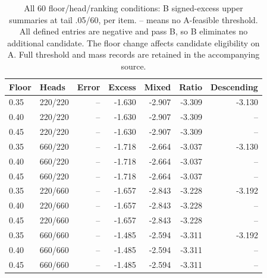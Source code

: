 \begin{table}[t]\centering\scriptsize
\caption{All 60 floor/head/ranking conditions: B signed-excess upper summaries at tail .05/60, per item. -- means no A-feasible threshold. All defined entries are negative and pass B, so B eliminates no additional candidate. The floor change affects candidate eligibility on A. Full threshold and mass records are retained in the accompanying source.}\label{tab:v8-floor-screen}
\begin{tabular}{llrrrrr}\toprule
Floor & Heads & Error & Excess & Mixed & Ratio & Descending\\\midrule
0.35 & 220/220 & -- & -1.630 & -2.907 & -3.309 & -3.130 \\
0.40 & 220/220 & -- & -1.630 & -2.907 & -3.309 & -- \\
0.45 & 220/220 & -- & -1.630 & -2.907 & -3.309 & -- \\
0.35 & 660/220 & -- & -1.718 & -2.664 & -3.037 & -3.130 \\
0.40 & 660/220 & -- & -1.718 & -2.664 & -3.037 & -- \\
0.45 & 660/220 & -- & -1.718 & -2.664 & -3.037 & -- \\
0.35 & 220/660 & -- & -1.657 & -2.843 & -3.228 & -3.192 \\
0.40 & 220/660 & -- & -1.657 & -2.843 & -3.228 & -- \\
0.45 & 220/660 & -- & -1.657 & -2.843 & -3.228 & -- \\
0.35 & 660/660 & -- & -1.485 & -2.594 & -3.311 & -3.192 \\
0.40 & 660/660 & -- & -1.485 & -2.594 & -3.311 & -- \\
0.45 & 660/660 & -- & -1.485 & -2.594 & -3.311 & -- \\
\bottomrule\end{tabular}\end{table}
